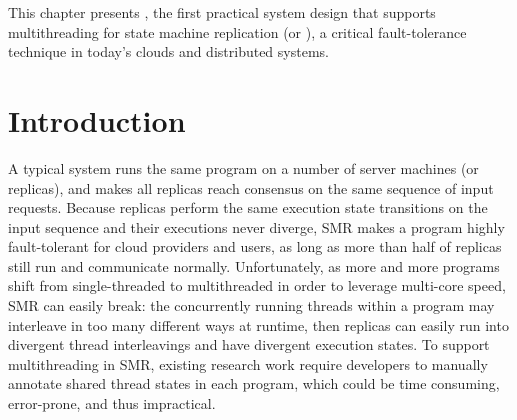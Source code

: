 This chapter presents \crane, the first practical system design that supports
multithreading for state machine replication (or \smr), a critical
fault-tolerance technique in today's clouds and distributed systems.

\section{Introduction} \label{sec:rep-intro}

A typical \smr system runs the same program on a
number of server machines (or replicas),
and makes all replicas reach consensus on the same sequence of input requests.
Because replicas perform the same execution state transitions on the input
sequence and their executions never diverge, SMR makes a program highly
fault-tolerant for cloud providers and users, as long as more than half of
replicas still run and communicate normally. Unfortunately, as more and more
programs shift
from single-threaded to multithreaded in order to leverage multi-core speed,
SMR can easily break: the concurrently running threads within a program may
interleave in too many different ways at runtime, then replicas can easily run
into divergent thread interleavings and have divergent execution states. To
support multithreading in SMR, 
existing research work require developers to manually annotate shared thread
states in each program, which could be time consuming, error-prone, and thus
impractical.


